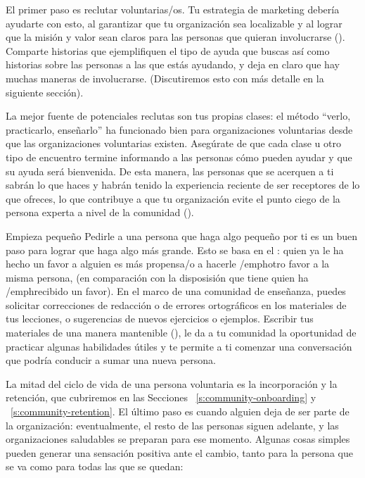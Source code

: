 El primer paso es reclutar voluntarias/os.
Tu estrategia de marketing debería ayudarte con esto, al garantizar que tu organización sea localizable
y al lograr que la misión y valor sean claros
para las personas que quieran involucrarse ().
Comparte historias que ejemplifiquen el tipo de ayuda que buscas 
así como historias sobre las personas a las que estás ayudando,
y deja en claro que hay muchas maneras de involucrarse.
(Discutiremos esto con más detalle en la siguiente sección).

La mejor fuente de potenciales reclutas son tus propias clases:
el método ``verlo, practicarlo, enseñarlo'' ha funcionado bien para organizaciones voluntarias
desde que las organizaciones voluntarias existen.
Asegúrate de que cada clase u otro tipo de encuentro
termine informando a las personas cómo pueden ayudar y que su ayuda será bienvenida.
De esta manera, las personas que se acerquen a ti sabrán lo que haces
y habrán tenido la experiencia reciente de ser receptores de lo que ofreces,
lo que contribuye a que tu organización evite el punto ciego de la persona experta a nivel de la comunidad ().

\begin{aside}{Empieza pequeño}
  Pedirle a una persona que haga algo pequeño por ti
  es un buen paso para lograr que haga algo más grande. Esto se basa en el :
  quien ya le ha hecho un favor a alguien es más propensa/o
  a hacerle /emph{otro} favor a la misma persona,
  (en comparación con la disposisión que tiene quien ha /emph{recibido} un favor).
  En el marco de una comunidad de enseñanza, 
  puedes solicitar correcciones de redacción o de errores ortográficos en los materiales de tus lecciones,
  o sugerencias de nuevos ejercicios o ejemplos.
  Escribir tus materiales de una manera mantenible (),
  le da a tu comunidad la oportunidad de practicar algunas habilidades útiles
  y te permite a ti comenzar una conversación
  que podría conducir a sumar una nueva persona.
\end{aside}


La mitad del ciclo de vida de una persona voluntaria es la incorporación y la retención,
que cubriremos en las Secciones ~\ref{s:community-onboarding} y ~\ref{s:community-retention}.
El último paso es cuando alguien deja de ser parte de la organización:
eventualmente, el resto de las personas siguen adelante,
y las organizaciones saludables se preparan para ese momento.
Algunas cosas simples pueden generar una sensación positiva ante el cambio, tanto para la persona que se va como para todas las que se quedan:


